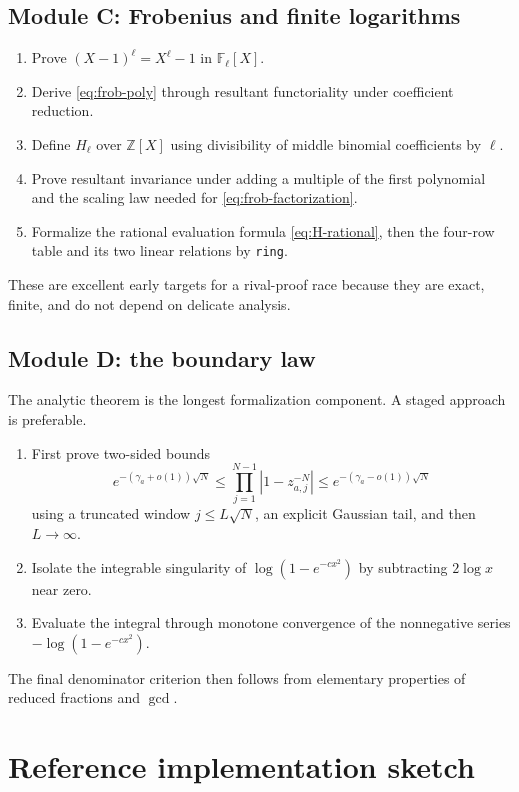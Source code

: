 \documentclass[11pt]{article}
\theoremstyle{definition}
\theoremstyle{remark}
\newcommand{\ZZ}{\mathbb Z}
\newcommand{\FF}{\mathbb F}
\begin{document}
\subsection{Module C: Frobenius and finite logarithms}
\begin{enumerate}
\item Prove \((X-1)^\ell=X^\ell-1\) in \(\FF_\ell[X]\).
\item Derive \eqref{eq:frob-poly} through resultant functoriality under coefficient reduction.
\item Define \(H_\ell\) over \(\ZZ[X]\) using divisibility of middle binomial coefficients by \(\ell\).
\item Prove resultant invariance under adding a multiple of the first polynomial and the scaling law needed for \eqref{eq:frob-factorization}.
\item Formalize the rational evaluation formula \eqref{eq:H-rational}, then the four-row table and its two linear relations by \texttt{ring}.
\end{enumerate}
These are excellent early targets for a rival-proof race because they are exact, finite, and do not depend on delicate analysis.

\subsection{Module D: the boundary law}
The analytic theorem is the longest formalization component.  A staged approach is preferable.
\begin{enumerate}
\item First prove two-sided bounds
\[
e^{-(\gamma_a+o(1))\sqrt N}
\le\prod_{j=1}^{N-1}|1-z_{a,j}^{-N}|
\le e^{-(\gamma_a-o(1))\sqrt N}
\]
using a truncated window \(j\le L\sqrt N\), an explicit Gaussian tail, and then \(L\to\infty\).
\item Isolate the integrable singularity of \(\log(1-e^{-cx^2})\) by subtracting \(2\log x\) near zero.
\item Evaluate the integral through monotone convergence of the nonnegative series
\(-\log(1-e^{-cx^2})\).
\end{enumerate}
The final denominator criterion then follows from elementary properties of reduced fractions and \(\gcd\).

\section{Reference implementation sketch}
\end{document}
